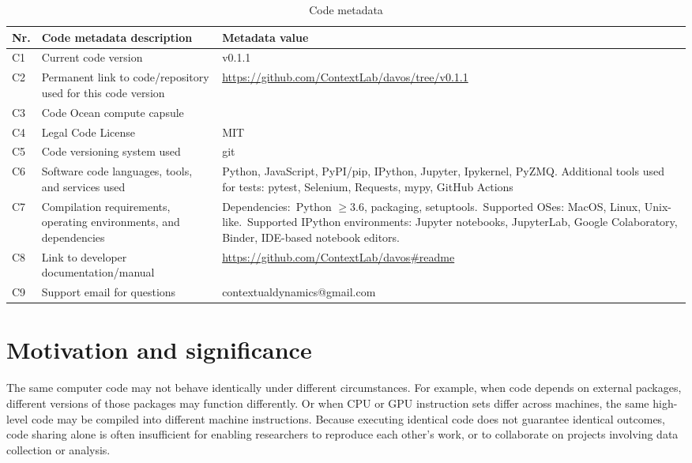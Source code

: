 \documentclass[preprint,12pt,a4paper]{elsarticle}
\begin{document}
\begin{table}[H]
\begin{tabular}{|l|p{6.5cm}|p{6.5cm}|}
\hline
\textbf{Nr.} & \textbf{Code metadata description} & \textbf{Metadata value} \\
\hline
C1 & Current code version &  v0.1.1 \\
\hline
C2 & Permanent link to code/repository used for this code version & \url{https://github.com/ContextLab/davos/tree/v0.1.1} \\
\hline
C3 & Code Ocean compute capsule & \\
\hline
C4 & Legal Code License & MIT \\
\hline
C5 & Code versioning system used & git \\
\hline
C6 & Software code languages, tools, and services used & Python, JavaScript, PyPI/pip, IPython, Jupyter, Ipykernel, PyZMQ. Additional tools used for tests: pytest, Selenium, Requests, mypy, GitHub Actions \\
\hline
C7 & Compilation requirements, operating environments, and
     dependencies & Dependencies:~Python $\geq 3.6$, packaging, setuptools.~Supported OSes: MacOS, Linux, Unix-like.~Supported IPython environments: Jupyter notebooks, JupyterLab, Google Colaboratory, Binder, IDE-based notebook editors. \\
\hline
C8 & Link to developer documentation/manual & \url{https://github.com/ContextLab/davos\#readme} \\
\hline
C9 & Support email for questions & contextualdynamics@gmail.com \\
\hline
\end{tabular}
\caption{Code metadata}
\label{}
\end{table}

\linenumbers

\section{Motivation and significance}

The same computer code may not behave identically under different
circumstances.  For example, when code depends on external packages,
different versions of those packages may function differently.  Or
when CPU or GPU instruction sets differ across machines, the same
high-level code may be compiled into different machine instructions.
Because executing identical code does not guarantee identical
outcomes, code sharing alone is often insufficient for enabling
researchers to reproduce each other's work, or to collaborate on
projects involving data collection or analysis.
\end{document}
